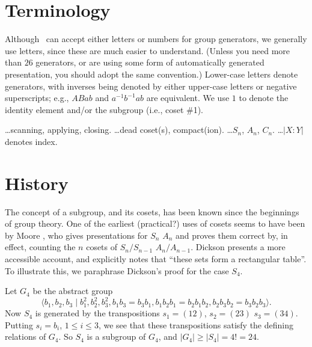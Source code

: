
%
%

\section{Terminology}

Although \ace\ can accept either letters or numbers for group generators,
  we generally use letters, since these are much easier to understand.
(Unless you need more than $26$ generators, or are using some form of 
  automatically generated presentation, you should adopt the same
  convention.)
Lower-case letters denote generators, with inverses being denoted by either
  upper-case letters or negative superscripts; e.g., $ABab$ and
  $a^{-1}b^{-1}ab$ are equivalent.
We use $1$ to denote the identity element and/or the subgroup (i.e.,
  coset \#1).

\dots scanning, applying, closing.
\dots dead coset(s), compact(ion).
\dots $S_n$, $A_n$, $C_n$.
\dots $|X:Y|$ denotes index.

\section{History}

The concept of a subgroup, and its cosets, has been known since the 
  beginnings of group theory.
One of the earliest (practical?) uses of cosets seems to have been by
  Moore \cite{Moo}, who gives presentations for $S_n$ \amp $A_n$ and
  proves them correct by, in effect, counting the $n$ cosets of 
  $S_n/S_{n-1}$ \amp $A_n/A_{n-1}$.
Dickson \cite[\S264]{Dic} presents a more accessible account, and 
  explicitly notes that ``these sets form a rectangular table''\kern-2pt.
%
To illustrate this, we paraphrase Dickson's proof for the case $S_4$.

Let $G_4$ be the abstract group
  $$ \langle b_1,b_2,b_3 \mid b_1^2,b_2^2,b_3^2,
       b_1b_3=b_3b_1, b_1b_2b_1=b_2b_1b_2,b_2b_3b_2=b_3b_2b_3 \rangle . $$
Now $S_4$ is generated by the transpositions $s_1=(12)$, $s_2=(23)$ \amp 
  $s_3=(34)$.
Putting $s_i=b_i$, $1 \le i \le 3$, we see that these transpositions 
  satisfy the defining relations of $G_4$.
So $S_4$ is a subgroup of $G_4$, and $|G_4| \ge |S_4| = 4! = 24$.

